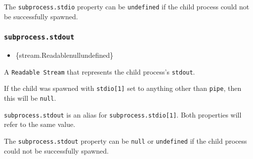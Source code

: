 The \texttt{subprocess.stdio} property can be \texttt{undefined} if the
child process could not be successfully spawned.

\subsubsection{\texorpdfstring{\texttt{subprocess.stdout}}{subprocess.stdout}}\label{subprocess.stdout}

\begin{itemize}
\tightlist
\item
  \{stream.Readable\textbar null\textbar undefined\}
\end{itemize}

A \texttt{Readable\ Stream} that represents the child process's
\texttt{stdout}.

If the child was spawned with \texttt{stdio{[}1{]}} set to anything
other than \texttt{\textquotesingle{}pipe\textquotesingle{}}, then this
will be \texttt{null}.

\texttt{subprocess.stdout} is an alias for
\texttt{subprocess.stdio{[}1{]}}. Both properties will refer to the same
value.

\begin{Shaded}
\begin{Highlighting}[]
\OperatorTok{=} \NormalTok{(}\NormalTok{)}\OperatorTok{;}

\OperatorTok{=} \NormalTok{(}\NormalTok{)}\OperatorTok{;}

\NormalTok{(}\OperatorTok{,}\KeywordTok{=\textgreater{}}\NormalTok{ \{}
  \NormalTok{(}\SpecialCharTok{$\{}\SpecialCharTok{\}}\VerbatimStringTok{\textasciigrave{}}\NormalTok{)}\OperatorTok{;}
\NormalTok{\})}\OperatorTok{;}
\end{Highlighting}
\end{Shaded}

The \texttt{subprocess.stdout} property can be \texttt{null} or
\texttt{undefined} if the child process could not be successfully
spawned.

